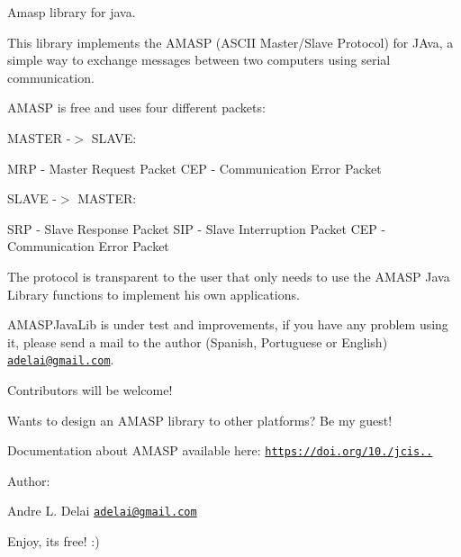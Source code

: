 Amasp library for java.

This library implements the A\+M\+A\+SP (A\+S\+C\+II Master/\+Slave Protocol) for J\+Ava, a simple way to exchange messages between two computers using serial communication.

A\+M\+A\+SP is free and uses four different packets\+:

M\+A\+S\+T\+ER -\/$>$ S\+L\+A\+VE\+:

M\+RP -\/ Master Request Packet C\+EP -\/ Communication Error Packet

S\+L\+A\+VE -\/$>$ M\+A\+S\+T\+ER\+:

S\+RP -\/ Slave Response Packet S\+IP -\/ Slave Interruption Packet C\+EP -\/ Communication Error Packet

The protocol is transparent to the user that only needs to use the A\+M\+A\+SP Java Library functions to implement his own applications.

A\+M\+A\+S\+P\+Java\+Lib is under test and improvements, if you have any problem using it, please send a mail to the author (Spanish, Portuguese or English) \href{mailto:adelai@gmail.com}{\tt adelai@gmail.\+com}.

Contributors will be welcome!

Wants to design an A\+M\+A\+SP library to other platforms? Be my guest!

Documentation about A\+M\+A\+SP available here\+: \href{https://doi.org/10.14209/jcis.2019.1}{\tt https\+://doi.\+org/10./jcis..}

Author\+:

Andre L. Delai \href{mailto:adelai@gmail.com}{\tt adelai@gmail.\+com}

Enjoy, it\textquotesingle{}s free! \+:) 